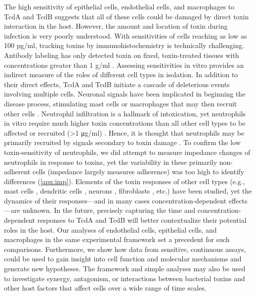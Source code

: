The high sensitivity of epithelial cells, endothelial cells, 
and macrophages to TcdA and TcdB suggests that all of 
these cells could be damaged by direct toxin interaction 
in the host. However, the amount and location of toxin 
during infection is very poorly understood. With 
sensitivities of cells reaching as low as 100 pg/ml, 
tracking toxins by immunohistochemistry is technically 
challenging. Antibody labeling has only detected toxin 
on fixed, toxin-treated tissues with concentrations 
greater than 1 \textmugreek{}g/ml \cite{Keel:2007jh}. Assessing sensitivities 
in vitro provides an indirect measure of the roles of 
different cell types in isolation. In addition to their 
direct effects, TcdA and TcdB initiate a cascade of 
deleterious events involving multiple cells. Neuronal 
signals have been implicated in beginning the disease 
process, stimulating mast cells or macrophages that may then 
recruit other cells 
\cite{Sorensson:2001da,Pothoulakis:1998vca,
Castagliuolo:1998fu,Castagliuolo:1994ta}. 
Neutrophil infiltration is a 
hallmark of intoxication, yet neutrophils in vitro require 
much higher toxin concentrations than all other cell types 
to be affected or recruited (>1 μg/ml) 
\cite{Kelly:1994cu,Brito:2002kq,Shah:1991ww,Pothoulakis:1988dk,Dailey:1987vo}. 
Hence, it is thought that neutrophils may be primarily 
recruited by signals secondary to toxin 
damage \cite{Kelly:1994cu,Sun:2010kt,Voth:2005di}. 
To confirm the low toxin-sensitivity of neutrophils, we 
did attempt to measure impedance changes of neutrophils 
in response to toxins, yet the variability in these 
primarily non-adherent cells (impedance largely measures adherence) 
was too high to identify differences (\autoref{apx:imp}). 
Elements of the toxin responses of other cell types 
(e.g., mast cells \cite{Meyer:2007kj,Calderon:1998tr,Gerhard:2011hm}, 
dendritic cells \cite{Lee:2008jf,Jafari:2013ji}, 
neurons \cite{Xia:2000gg,Neunlist:2003ba}, 
fibroblasts \cite{Wedel:1983vd,ChavesOlarte:1996jy}, etc.) have been 
studied, yet the dynamics of their responses—and in many 
cases concentration-dependent effects—are unknown. In the 
future, precisely capturing the time and concentration-dependent 
responses to TcdA and TcdB will better contextualize their 
potential roles in the host. Our analyses of endothelial 
cells, epithelial cells, and macrophages in the same 
experimental framework set a precedent for such comparisons. 
Furthermore, we show how data from sensitive, continuous 
assays, could be used to gain insight into cell function 
and molecular mechanisms and generate new hypotheses. The 
framework and simple analyses may also be used to investigate 
synergy, antagonism, or interactions between bacterial toxins 
and other host factors that affect cells over a wide range of 
time scales.


